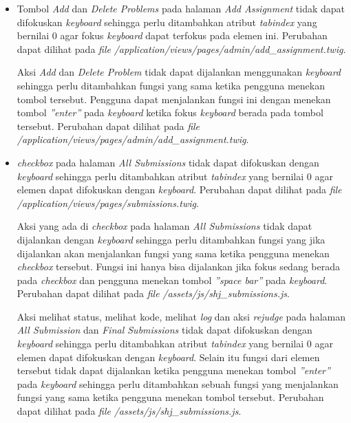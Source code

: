 \begin{itemize}
	\item Tombol \textit{Add} dan \textit{Delete Problems} pada halaman \textit{Add Assignment} tidak dapat difokuskan \textit{keyboard} sehingga perlu ditambahkan atribut \textit{tabindex} yang bernilai 0 agar fokus \textit{keyboard} dapat terfokus pada elemen ini. Perubahan dapat dilihat pada \textit{file} \textit{/application/views/pages/admin/add\_assignment.twig}.

	Aksi \textit{Add} dan \textit{Delete Problem} tidak dapat dijalankan menggunakan \textit{keyboard} sehingga perlu ditambahkan fungsi yang sama ketika pengguna menekan tombol tersebut. Pengguna dapat menjalankan fungsi ini dengan menekan tombol \textit{''enter''} pada \textit{keyboard} ketika fokus \textit{keyboard} berada pada tombol tersebut. Perubahan dapat dilihat pada \textit{file} \textit{/application/views/pages/admin/add\_assignment.twig}.

	\item \textit{checkbox} pada halaman \textit{All Submissions} tidak dapat difokuskan dengan \textit{keyboard} sehingga perlu ditambahkan atribut \textit{tabindex} yang bernilai 0 agar elemen dapat difokuskan dengan \textit{keyboard}. Perubahan dapat dilihat pada \textit{file} \textit{/application/views/pages/submissions.twig}.
	
	Aksi yang ada di \textit{checkbox} pada halaman \textit{All Submissions} tidak dapat dijalankan dengan \textit{keyboard} sehingga perlu ditambahkan fungsi yang jika dijalankan akan menjalankan fungsi yang sama ketika pengguna menekan \textit{checkbox} tersebut. Fungsi ini hanya bisa dijalankan jika fokus sedang berada pada \textit{checkbox} dan pengguna menekan tombol \textit{''space bar''} pada \textit{keyboard}. Perubahan dapat dilihat pada \textit{file} \textit{/assets/js/shj\_submissions.js}.
	
	Aksi melihat status, melihat kode, melihat \textit{log} dan aksi \textit{rejudge} pada halaman \textit{All Submission} dan \textit{Final Submissions} tidak dapat difokuskan dengan \textit{keyboard} sehingga perlu ditambahkan atribut \textit{tabindex} yang bernilai 0 agar elemen dapat difokuskan dengan \textit{keyboard}. Selain itu fungsi dari elemen tersebut tidak dapat dijalankan ketika pengguna menekan tombol \textit{''enter''} pada \textit{keyboard} sehingga perlu ditambahkan sebuah fungsi yang menjalankan fungsi yang sama ketika pengguna menekan tombol tersebut. Perubahan dapat dilihat pada \textit{file} \textit{/assets/js/shj\_submissions.js}.
	

\end{itemize}
